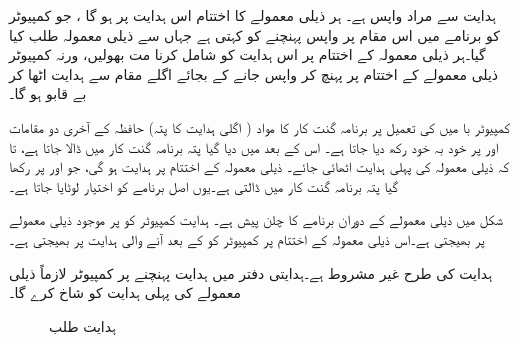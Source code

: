 ہدایت \sRET سے مراد واپس   ہے۔ ہر ذیلی معمولے  کا اختتام اس ہدایت پر ہو گا ، جو کمپیوٹر کو برنامے میں اس مقام پر واپس پہنچنے کو کہتی ہے جہاں سے  ذیلی معمولہ طلب کیا گیا۔ہر ذیلی معمولہ کے اختتام پر اس ہدایت کو شامل کرنا مت  بھولیں، ورنہ کمپیوٹر ذیلی معمولے کے اختتام پر پہنچ کر واپس جانے کے بجائے اگلے مقام سے ہدایت اٹھا کر  بے قابو ہو گا۔

کمپیوٹر با میں \sCALL کی تعمیل پر برنامہ گنت کار کا مواد  ( اگلی ہدایت کا پتہ)  حافظہ  کے آخری دو مقامات   اور  پر  خود بہ خود    رکھ دیا جاتا ہے۔ اس کے بعد \sCALL میں دیا گیا پتہ برنامہ گنت کار میں ڈالا جاتا ہے، تا کہ ذیلی معمولہ کی پہلی ہدایت  اٹھائی جائے۔ ذیلی معمولہ  کے اختتام پر \sRET ہدایت  ہو گی، جو  اور   پر رکھا گیا  پتہ برنامہ گنت کار میں ڈالتی ہے۔یوں اصل برنامے  کو اختیار   لوٹایا جاتا ہے۔ 

شکل   میں  ذیلی معمولے  کے دوران برنامے کا چلن پیش ہے۔  ہدایت  کمپیوٹر کو  پر موجود ذیلی معمولے  پر بھیجتی ہے۔اس ذیلی معمولہ کے اختتام پر \sRET کمپیوٹر کو  \sCALL کے بعد آنے والی ہدایت پر بھیجتی ہے۔

ہدایت \sJMP کی طرح \sCALL غیر مشروط ہے۔ہدایتی دفتر میں  \sCALL  ہدایت  پہنچنے پر کمپیوٹر لازماً ذیلی معمولے کی پہلی ہدایت کو شاخ کرے گا۔

\begin{figure}
\centering
{}
\caption{ہدایت طلب}
\label{شکل_کمپیوٹر_با_ہدایت_طلب}
\end{figure}

